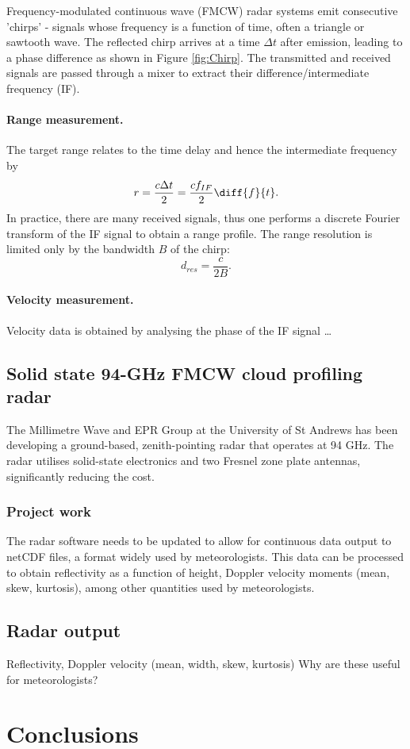 \documentclass{article}
\begin{document}
Frequency-modulated continuous wave (FMCW) radar systems emit consecutive 'chirps' - signals whose frequency is a function of time, often a triangle or sawtooth wave. The reflected chirp arrives at a time \(\Delta t\) after emission, leading to a phase difference as shown in Figure \ref{fig:Chirp}. The transmitted and received signals are passed through a mixer to extract their difference/intermediate frequency (IF).

\paragraph{Range measurement.} The target range relates to the time delay and hence the intermediate frequency by
\begin{equation}
	r = \frac{c \Delta t}{2} = \frac{c f_{IF}}{2} \diff{f}{t}.
\end{equation}
In practice, there are many received signals, thus one performs a discrete Fourier transform of the IF signal to obtain a range profile. The range resolution is limited only by the bandwidth \(B\) of the chirp:
\begin{equation}
	d_{res} = \frac{c}{2B}.
\end{equation}

\paragraph{Velocity measurement.} Velocity data is obtained by analysing the phase of the IF signal \dots

\subsection{Solid state 94-GHz FMCW cloud profiling radar}
The Millimetre Wave and EPR Group at the University of St Andrews has been developing a ground-based, zenith-pointing radar that operates at 94 GHz. \supercite{StAndrewsRadar} The radar utilises solid-state electronics and two Fresnel zone plate antennas, significantly reducing the cost.

\subsubsection{Project work}
The radar software needs to be updated to allow for continuous data output to netCDF files, a format widely used by meteorologists. This data can be processed to obtain reflectivity as a function of height, Doppler velocity moments (mean, skew, kurtosis), among other quantities used by meteorologists.

\subsection{Radar output}
Reflectivity, Doppler velocity (mean, width, skew, kurtosis)
Why are these useful for meteorologists?

\section{Conclusions}

\printbibliography
\end{document}
